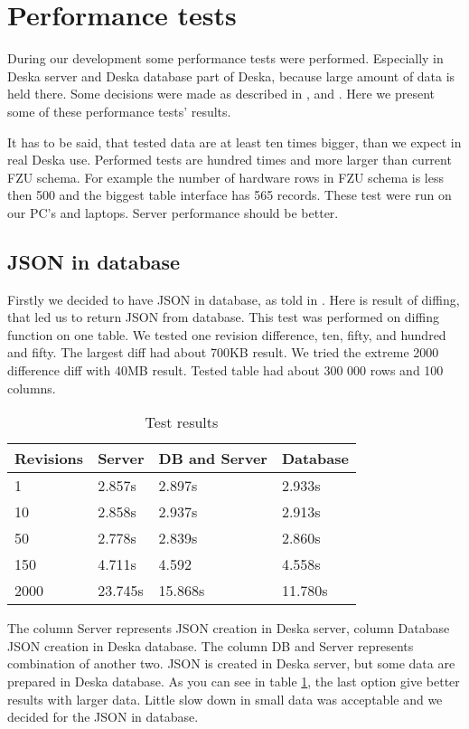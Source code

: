 \documentclass[deska]{subfiles}
\begin{document}
\section{Performance tests}
\label{sec:performance}

During our development some performance tests were performed. Especially in Deska server and Deska database
part of Deska, because large amount of data is held there. Some decisions were made as described in
,  and .
Here we present some of these performance tests' results.

It has to be said, that tested data are at least ten times bigger, than we
expect in real Deska use. Performed tests are hundred times and more larger
than current FZU schema.
For example the number of hardware rows in FZU schema is less then 500 
and the biggest table interface has 565 records.
These test were run on our PC's and laptops. Server performance should be better.

\subsection{JSON in database}
\label{sec:test-json}
Firstly we decided to have JSON in database, as told in .
Here is result of diffing, that led us to
return JSON from database.
This test was performed on diffing function on one table.
We tested one revision difference, ten, fifty, and hundred and fifty.
The largest diff had about 700KB result.
We tried the extreme 2000 difference diff with 40MB result.
Tested table had about 300 000 rows and 100 columns.

\begin{longtable}{ l | l | l | l}
\caption{Test results} \\
Revisions & Server & DB and Server & Database \\
\hline
\endhead
\label{test:json}
1 & 2.857s & 2.897s & 2.933s \\
10 & 2.858s & 2.937s & 2.913s \\
50 & 2.778s & 2.839s & 2.860s \\
150 & 4.711s & 4.592 & 4.558s \\
2000 & 23.745s & 15.868s & 11.780s \\
\end{longtable}

The column Server represents JSON creation in Deska server, column Database JSON creation in
Deska database. The column DB and Server represents combination of another two. JSON is created
in Deska server, but some data are prepared in Deska database.
As you can see in table \ref{test:json}, the last option give better results with larger data.
Little slow down in small data was acceptable and we decided for the JSON in database.
\end{document}
